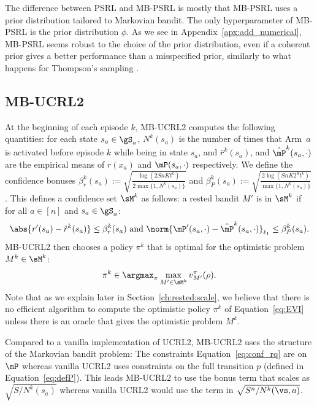 The difference between PSRL and MB-PSRL is mostly that MB-PSRL uses a prior distribution tailored to Markovian bandit.  The only hyperparameter of MB-PSRL is the prior distribution $\phi$. As we see in Appendix~\ref{apx:add_numerical},
MB-PSRL seems robust to the choice of the prior distribution, even if a
coherent prior gives a better performance than a misspecified prior, similarly
to what happens for Thompson's sampling \cite{russo2018tutorial}. 

\subsection{MB-UCRL2}
At the beginning of each episode $k$, MB-UCRL2 computes the following quantities: for each state $s_a\in\gS_a$, $N^{k}(s_a)$ is the number of times that Arm~$a$ is activated before episode $k$ while being in state $s_a$, and $\hat{r}^{k}(s_a)$, and $\hat{\mP}^{k}(s_a,\cdot)$ are the empirical means of $r(x_a)$ and $\mP(s_a,\cdot)$ respectively. We define the confidence bonuses
$\beta_r^{k}(s_a):=\sqrt{\frac{\log(2SnKt^{k})}{2\max\{1,N^{k}(s_a)\}}}$
and
$\beta_P^{k}(s_a):=\sqrt{\frac{2\log(SnK2^St^k)}{\max\{1,N^{k}(s_a)\}}}$.
This defines a confidence set $\sM^k$  as follows: a rested bandit $M'$
is in $\sM^k$ if for all $a\in[n]$ and $s_a\in\gS_a$: 
\begin{align}
    \label{eq:conf_rq}
    \abs{r'(s_a) - \hat{r}^{k}(s_a)} \le \beta_r^{k}(s_a) \text{ and }
    \norm{{\mP'}(s_a,\cdot) - \hat{\mP}^{k}(s_a,\cdot)}_{\ell_1} \le \beta_P^{k}(s_a).            
\end{align}
MB-UCRL2 then chooses a policy $\pi^k$ that is optimal for the optimistic problem $M^k\in\sM^k$:
\begin{align}
    \pi^k \in \argmax_{\pi} \max_{M'\in\sM^k}v^{\pi}_{M'}(\rho).
    \label{eq:EVI}
\end{align}
Note that as we explain later in Section~\ref{ch:rested:scale}, we believe that there is no  efficient algorithm to compute the optimistic policy $\pi^k$ of Equation~\eqref{eq:EVI} unless there is an oracle that gives the optimistic problem $M^k$.

Compared to a vanilla implementation of UCRL2, MB-UCRL2 uses the structure of the Markovian bandit problem: The constraints Equation~\eqref{eq:conf_rq} are on $\mP$ whereas vanilla UCRL2 uses constraints on the full transition $p$ (defined in Equation~\eqref{eq:defP}). This leads MB-UCRL2 to use the bonus term that scales as $\sqrt{S/N^{k}(s_a)}$ whereas vanilla UCRL2 would use the term in $\sqrt{S^n/N^{k}(\vs, a)}$.

